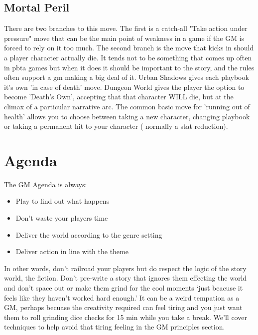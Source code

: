 \documentclass{tufte-handout}
\begin{document}
\subsection{Mortal Peril}
There are two branches to this move. The first is a catch-all "Take action under pressure" move that can be the main point of weakness in a game if the GM is forced to rely on it too much. 
The second branch is the move that kicks in should a player character actually die. It tends not to be something that comes up often in pbta games but when it does it should be important to the story, and the rules often support a gm making a big deal of it. Urban Shadows gives each playbook it's own 'in case of death' move. Dungeon World gives the player the option to become 'Death's Own', accepting that that character WILL die, but at the climax of a particular narrative arc.
The common basic move for 'running out of health' allows you to choose between taking a new character, changing playbook or taking a permanent hit to your character ( normally a stat reduction). 

\section{Agenda}
The GM Agenda is always:

\begin{itemize}
\item Play to find out what happens
\item Don't waste your players time
\item Deliver the world according to the genre setting
\item Deliver action in line with the theme
\end{itemize}

In other words, don't railroad your players but do respect the logic of the story world, the fiction. Don't pre-write a story that ignores them effecting the world and don't space out or make them grind for the cool moments `just beacuse it feels like they haven't worked hard enough.' It can be a weird tempation as a GM, perhaps becuase the creativity required can feel tiring and you just want them to roll grinding dice checks for 15 min while you take a break. We'll cover techniques to help avoid that tiring feeling in the GM principles section.
\end{document}
